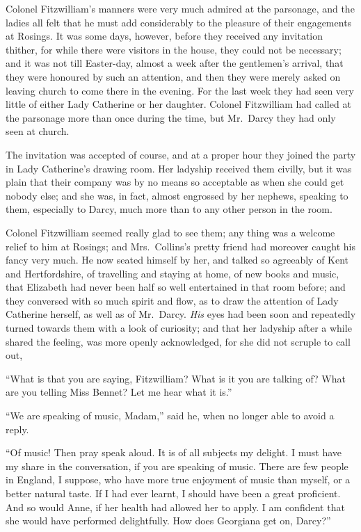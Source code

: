 
Colonel Fitzwilliam’s manners were very much admired
at the parsonage, and the ladies all felt that he
must add considerably to the pleasure of their engagements
at Rosings. It was some days, however, before
they received any invitation thither, for while there were
visitors in the house, they could not be necessary; and
it was not till Easter-day, almost a week after the gentlemen’s
arrival, that they were honoured by such an attention,
and then they were merely asked on leaving church
to come there in the evening. For the last week they had
seen very little of either Lady Catherine or her daughter.
Colonel Fitzwilliam had called at the parsonage more than
once during the time, but Mr.\ Darcy they had only seen
at church.

The invitation was accepted of course, and at a proper
hour they joined the party in Lady Catherine’s drawing
room. Her ladyship received them civilly, but it was
plain that their company was by no means so acceptable
as when she could get nobody else; and she was, in fact,
almost engrossed by her nephews, speaking to them,
especially to Darcy, much more than to any other person
in the room.

Colonel Fitzwilliam seemed really glad to see them;
any thing was a welcome relief to him at Rosings; and
Mrs.\ Collins’s pretty friend had moreover caught his fancy
very much. He now seated himself by her, and talked
so agreeably of Kent and Hertfordshire, of travelling and
staying at home, of new books and music, that Elizabeth
had never been half so well entertained in that room before;
and they conversed with so much spirit and flow, as to
draw the attention of Lady Catherine herself, as well as
of Mr.\ Darcy. \textit{His} eyes had been soon and repeatedly
turned towards them with a look of curiosity; and that
her ladyship after a while shared the feeling, was more
openly acknowledged, for she did not scruple to call out,

“What is that you are saying, Fitzwilliam? What is
it you are talking of? What are you telling Miss Bennet?
Let me hear what it is.”

“We are speaking of music, Madam,” said he, when
no longer able to avoid a reply.

“Of music! Then pray speak aloud. It is of all
subjects my delight. I must have my share in the conversation,
if you are speaking of music. There are few people
in England, I suppose, who have more true enjoyment
of music than myself, or a better natural taste.
If I had ever learnt, I should have been a great proficient.
And so would Anne, if her health had allowed her to apply.
I am confident that she would have performed delightfully.
How does Georgiana get on, Darcy?”

